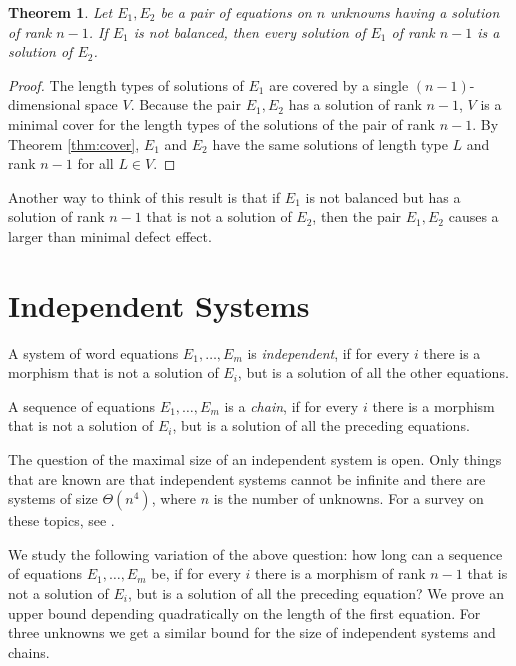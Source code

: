 \documentclass[submission]{eptcs}
\newtheorem{theorem}{Theorem}[section]
\theoremstyle{definition}
\begin{document}
\begin{theorem} \label{thm:balance}
Let $E_1, E_2$ be a pair of equations on $n$ unknowns having a
solution of rank $n-1$. If $E_1$ is not balanced, then every
solution of $E_1$ of rank $n-1$ is a solution of $E_2$.
\end{theorem}
\begin{proof}
The length types of solutions of $E_1$ are covered by a single
$(n-1)$-dimensional space $V$. Because the pair $E_1, E_2$ has a
solution of rank $n-1$, $V$ is a minimal cover for the length types
of the solutions of the pair of rank $n-1$. By Theorem
\ref{thm:cover}, $E_1$ and $E_2$ have the same solutions of length
type $L$ and rank $n-1$ for all $L \in V$.
\end{proof}

Another way to think of this result is that if $E_1$ is not balanced
but has a solution of rank $n-1$ that is not a solution of $E_2$,
then the pair $E_1, E_2$ causes a larger than minimal defect effect.


\section{Independent Systems} \label{sect:indsyst}

A system of word equations $E_1, \dots, E_m$ is \emph{independent},
if for every $i$ there is a morphism that is not a solution of
$E_i$, but is a solution of all the other equations.

A sequence of equations $E_1, \dots, E_m$ is a \emph{chain}, if for
every $i$ there is a morphism that is not a solution of $E_i$, but
is a solution of all the preceding equations.

The question of the maximal size of an independent system is open.
Only things that are known are that independent systems cannot be
infinite and there are systems of size $\Theta(n^4)$, where $n$ is
the number of unknowns. For a survey on these topics, see
\cite{KaSa11}.

We study the following variation of the above question: how long can
a sequence of equations $E_1, \dots, E_m$ be, if for every $i$ there
is a morphism of rank $n-1$ that is not a solution of $E_i$, but is
a solution of all the preceding equation? We prove an upper bound
depending quadratically on the length of the first equation. For
three unknowns we get a similar bound for the size of independent
systems and chains.
\end{document}
